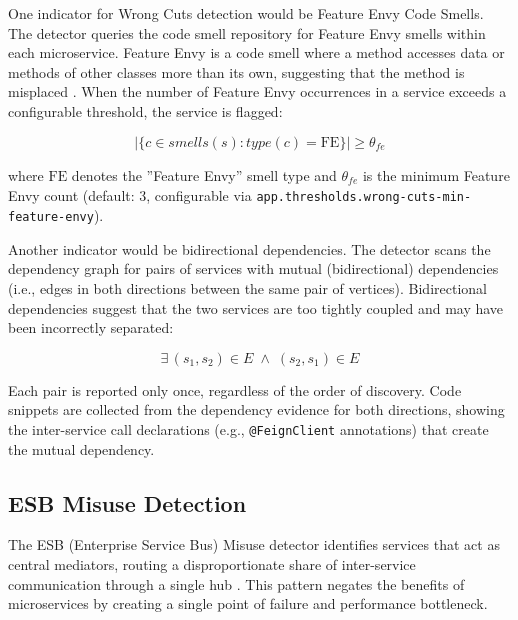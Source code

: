 One indicator for Wrong Cuts detection would be Feature Envy Code Smells. The detector queries the code smell repository for Feature Envy smells within each microservice. Feature Envy is a code smell where a method accesses data or methods of other classes more than its own, suggesting that the method is misplaced \cite{Fowler1999}. When the number of Feature Envy occurrences in a service exceeds a configurable threshold, the service is flagged:

\begin{equation}
    \bigl|\{c \in \mathit{smells}(s) : \mathit{type}(c) = \mathrm{FE}\}\bigr| \geq \theta_{\mathit{fe}}
    \label{eq:wrong-cuts-fe}
\end{equation}

\noindent where $\mathrm{FE}$ denotes the ''Feature Envy'' smell type and $\theta_{\mathit{fe}}$ is the minimum Feature Envy count (default: 3, configurable via \texttt{app\-.thres\-holds.\-wrong-cuts\--min\--feat\-ure\--envy}).

Another indicator would be bidirectional dependencies. The detector scans the dependency graph for pairs of services with mutual (bidirectional) dependencies (i.e., edges in both directions between the same pair of vertices). Bidirectional dependencies suggest that the two services are too tightly coupled and may have been incorrectly separated:

\begin{equation}
    \exists\, (s_1, s_2) \in E \;\wedge\; (s_2, s_1) \in E
    \label{eq:wrong-cuts-bidir}
\end{equation}

Each pair is reported only once, regardless of the order of discovery. Code snippets are collected from the dependency evidence for both directions, showing the inter-service call declarations (e.g., \texttt{@FeignClient} annotations) that create the mutual dependency.

\subsection{ESB Misuse Detection}
\label{subsec:detect-esb-misuse}

\par The ESB (Enterprise Service Bus) Misuse detector identifies services that act as central mediators, routing a disproportionate share of inter-service communication through a single hub \cite{Taibi2018, Richards2015}. This pattern negates the benefits of microservices by creating a single point of failure and performance bottleneck.

